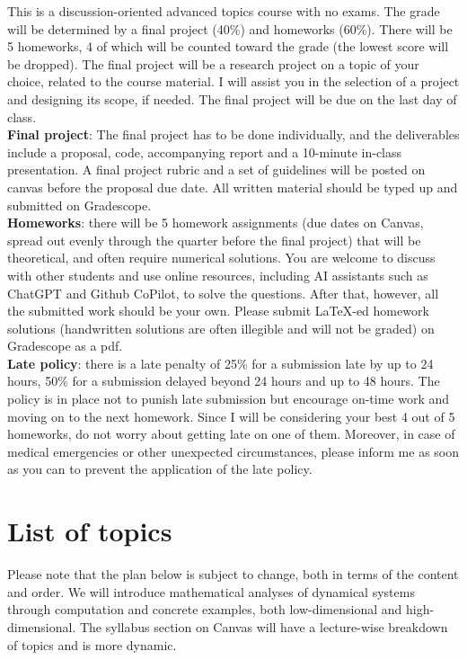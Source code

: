 \documentclass[12pt]{article}
\begin{document}
This is a discussion-oriented advanced topics course with no exams. The grade will be determined by a final project (40\%) and homeworks (60\%). There will be 5 homeworks, 4 of which will be counted toward the grade (the lowest score will be dropped). The final project will be a research project on a topic of your choice, related to the course material. I will assist you in the selection of a project and designing its scope, if needed. The final project will be due on the last day of class. \\


\textbf{Final project}: The final project has to be done individually, and the deliverables include a proposal, code, accompanying report and a 10-minute in-class presentation. A final project rubric and a set of guidelines will be posted on canvas before the proposal due date. All written material should be typed up and submitted on Gradescope.\\

\textbf{Homeworks}: there will be 5 homework assignments (due dates on Canvas, spread out evenly through the quarter before the final project) that will be theoretical, and often require numerical solutions. You are welcome to discuss with other students and use online resources, including AI assistants such as ChatGPT and Github CoPilot, to solve the questions. After that, however, all the submitted work should be your own. Please submit LaTeX-ed homework solutions (handwritten solutions are often illegible and will not be graded) on Gradescope as a pdf. \\


\textbf{Late policy}: there is a late penalty of 25\% for a submission late by up to 24 hours, 50\% for a submission delayed beyond 24 hours and up to 48 hours. The policy is in place not to punish late submission but 
encourage on-time work and moving on to the next homework. Since I will be considering your best 4 out of 5 homeworks, do not worry about getting late on one of them. Moreover, in case of medical emergencies or other unexpected circumstances, please inform me as soon as you can to prevent the application of the late policy. 



\section{List of topics}
\label{sec:topics}
Please note that the plan below is subject to change, both in terms of the content and order. We will introduce mathematical analyses of dynamical systems through computation and concrete examples, both low-dimensional and high-dimensional.
The syllabus section on Canvas will have a lecture-wise breakdown of topics and is more dynamic. 
\end{document}
